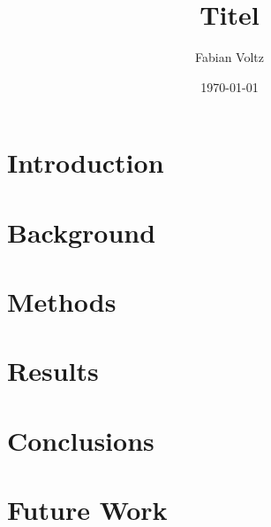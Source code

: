 \documentclass[letterpaper,12pt]{article}
\begin{document}
\title{Titel}
\author{Fabian Voltz}
\date{\today}
\maketitle

\begin{abstract}

\end{abstract}


\section{Introduction}


\section{Background}


\section{Methods}


\section{Results}


\section{Conclusions}


\section{Future Work}
\end{document}
